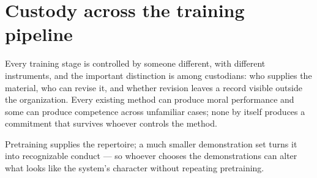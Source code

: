 \section{Custody across the training pipeline}
\label{sec:23.2}
Every training stage is controlled by someone different, with different instruments, and the important distinction is among custodians: who supplies the material, who can revise it, and whether revision leaves a record visible outside the organization. Every existing method can produce moral performance and some can produce competence across unfamiliar cases; none by itself produces a commitment that survives whoever controls the method.


Pretraining supplies the repertoire; a much smaller demonstration set turns it into recognizable conduct \autocite{ouyang2022training} — so whoever chooses the demonstrations can alter what looks like the system's character without repeating pretraining.


